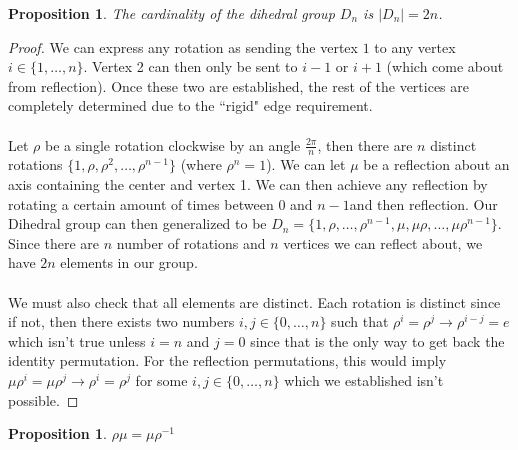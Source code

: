 \documentclass{article}
\newtheorem{proposition}[theorem]{Proposition}
\theoremstyle{definition}
\begin{document}
\begin{proposition}
    The cardinality of the dihedral group $D_n$ is $|D_n|=2n$.
\end{proposition}
\begin{proof}
    We can express any rotation as sending the vertex $1$ to any vertex $i\in \{1,\ldots,n\}$. Vertex 2 can then only be sent to $i-1$ or $i+1$ (which come about from reflection). Once these two are established, the rest of the vertices are completely determined due to the ``rigid" edge requirement.\\\\
    Let $\rho$ be a single rotation clockwise by an angle $\frac{2\pi}{n}$, then there are $n$ distinct rotations $\{1,\rho,\rho^2,\ldots,\rho^{n-1}\}$ (where $\rho^n=1$). We can let $\mu$ be a reflection about an axis containing the center and vertex 1. We can then achieve any reflection by rotating a certain amount of times between $0$ and $n-1$and then reflection. Our Dihedral group can then generalized to be $D_n =\{1,\rho,\ldots,\rho^{n-1},\mu,\mu\rho,\ldots,\mu \rho^{n-1}\}$. Since there are $n$ number of rotations and $n$ vertices we can reflect about, we have $2n$ elements in our group. \\\\
    We must also check that all elements are distinct. Each rotation is distinct since if not, then there exists two numbers $i,j\in \{0,\ldots,n\}$ such that $\rho^i=\rho^j\rightarrow \rho^{i-j}=e$ which isn't true unless $i=n$ and $j=0$ since that is the only way to get back the identity permutation. For the reflection permutations, this would imply $\mu \rho^i=\mu \rho^j \rightarrow \rho^i=\rho^j$ for some $i,j\in \{0,\ldots,n\}$ which we established isn't possible.
\end{proof}
\begin{proposition}
    $\rho\mu = \mu \rho^{-1}$
\end{proposition}
\end{document}
